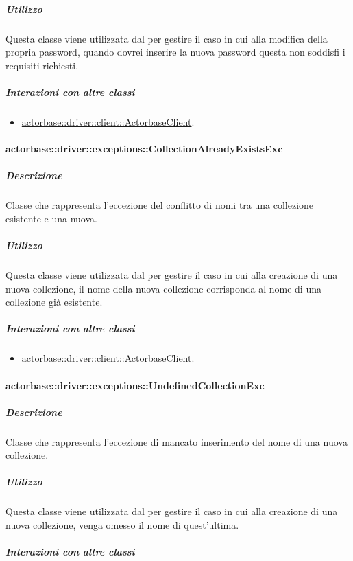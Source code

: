 \documentclass{scalatekids-article}
\begin{document}
\subparagraph{Utilizzo}

Questa classe viene utilizzata dal  per gestire il caso in cui alla modifica della propria password, quando dovrei inserire la nuova password questa non soddisfi i requisiti richiesti.

\subparagraph{Interazioni con altre classi}

\begin{itemize}
\item \hyperref[sec:actorbase::driver::client::ActorbaseClient]{actorbase::driver::client::ActorbaseClient}.
\end{itemize}

\paragraph{actorbase::driver::exceptions::CollectionAlreadyExistsExc}

\subparagraph{Descrizione}

Classe che rappresenta l'eccezione del conflitto di nomi tra una collezione esistente e una nuova.

\subparagraph{Utilizzo}

Questa classe viene utilizzata dal  per gestire il caso in cui alla creazione di una nuova collezione, il nome della nuova collezione corrisponda al nome di una collezione già esistente.

\subparagraph{Interazioni con altre classi}

\begin{itemize}
\item \hyperref[sec:actorbase::driver::client::ActorbaseClient]{actorbase::driver::client::ActorbaseClient}.
\end{itemize}

\paragraph{actorbase::driver::exceptions::UndefinedCollectionExc}

\subparagraph{Descrizione}

Classe che rappresenta l'eccezione di mancato inserimento del nome di una nuova collezione.

\subparagraph{Utilizzo}

Questa classe viene utilizzata dal  per gestire il caso in cui alla creazione di una nuova collezione, venga omesso il nome di quest'ultima.

\subparagraph{Interazioni con altre classi}
\end{document}
